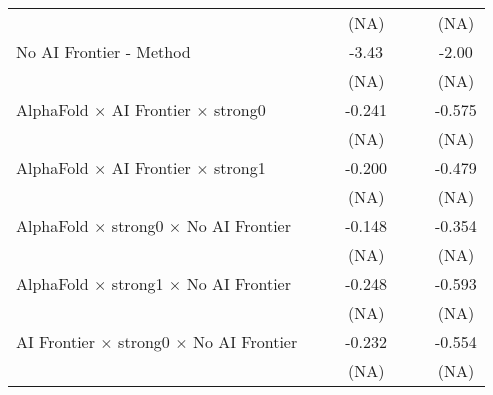 \begin{tabular}{lcccccc}
                                                                              &                        &        & (NA)   &                        &       & (NA)\\   
   No AI Frontier - Method                                                    &                        &        & -3.43  &                        &       & -2.00\\   
                                                                              &                        &        & (NA)   &                        &       & (NA)\\   
   AlphaFold $\times$ AI Frontier $\times$ strong0                            &                        &        & -0.241 &                        &       & -0.575\\   
                                                                              &                        &        & (NA)   &                        &       & (NA)\\   
   AlphaFold $\times$ AI Frontier $\times$ strong1                            &                        &        & -0.200 &                        &       & -0.479\\   
                                                                              &                        &        & (NA)   &                        &       & (NA)\\   
   AlphaFold $\times$ strong0 $\times$ No AI Frontier                         &                        &        & -0.148 &                        &       & -0.354\\   
                                                                              &                        &        & (NA)   &                        &       & (NA)\\   
   AlphaFold $\times$ strong1 $\times$ No AI Frontier                         &                        &        & -0.248 &                        &       & -0.593\\   
                                                                              &                        &        & (NA)   &                        &       & (NA)\\   
   AI Frontier $\times$ strong0 $\times$ No AI Frontier                       &                        &        & -0.232 &                        &       & -0.554\\   
                                                                              &                        &        & (NA)   &                        &       & (NA)\\   

\end{tabular}

